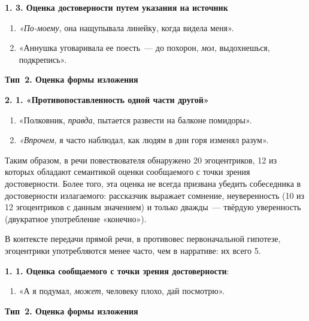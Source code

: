 \documentclass{kursa4}
\begin{document}
{      \textbf{1. 3. Оценка достоверности путем указания на источник}
        \setcounter{saveenum}{\value{enumi}}
        \begin{enumerate}
        \setcounter{enumi}{\value{saveenum}}
        \item \textit{«По-моему}, она нащупывала линейку, когда видела меня».
        \item «Аннушка уговаривала ее поесть~--- до похорон, \textit{мол},
        выдохнешься, подкрепись».
      \end{enumerate}

      {\centering
      \textbf{Тип~2. Оценка формы изложения}
      \par}

      \textbf{2. 1. «Противопоставленность одной части другой»}
        \setcounter{saveenum}{\value{enumi}}
        \begin{enumerate}
        \setcounter{enumi}{\value{saveenum}}
        \item «Полковник, \textit{правда}, пытается развести на балконе помидоры».
        \item \textit{«Впрочем,} я часто наблюдал, как людям в дни горя изменял разум».
      \end{enumerate}

      Таким образом, в речи повествователя обнаружено 20 эгоцентриков, 12
      из которых обладают семантикой оценки сообщаемого с точки зрения
      достоверности. Более того, эта оценка не всегда призвана убедить
      собеседника в достоверности излагаемого: рассказчик выражает сомнение,
      неуверенность (10 из 12 эгоцентриков с данным значением) и только
      дважды~--- твёрдую уверенность (двукратное употребление «конечно»). 

      В контексте передачи прямой речи, в противовес первоначальной
      гипотезе, эгоцентрики употребляются менее часто, чем в нарративе: их
      всего 5. 

      {\par}

      \textbf{1. 1. Оценка сообщаемого с точки
      зрения достоверности}:
      \begin{enumerate}
        \item «А я подумал, \textit{может}, человеку плохо, дай посмотрю».
      \end{enumerate}

      {\centering
      \textbf{Тип~2. Оценка формы изложения }
      \par}

}
\end{document}
